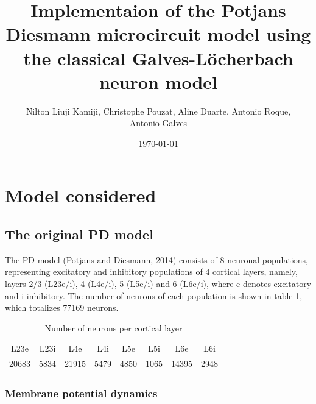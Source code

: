 \documentclass[11pt]{scrartcl}
\author{Nilton Liuji Kamiji, Christophe Pouzat, Aline Duarte, Antonio Roque, \\Antonio Galves}
\date{\today}
\title{Implementaion of the Potjans Diesmann microcircuit model using the classical Galves-L\"{o}cherbach neuron model}
\begin{document}
\maketitle
\tableofcontents
\pagebreak
\listoffigures
\pagebreak

\section{Model considered}
\label{sec:org8d5c27a}
\subsection{The original PD model}
\label{sec:orga57681e}
\label{org436adc3}

The PD model (Potjans and Diesmann, 2014) consists of 8 neuronal populations, representing excitatory and inhibitory populations of 4 cortical layers, namely, layers 2/3 (L23e/i), 4 (L4e/i), 5 (L5e/i) and 6 (L6e/i), where e denotes excitatory and i inhibitory. The number of neurons of each population is shown in table \ref{table:PD_num_neurons}, which totalizes 77169 neurons.
\begin{table}[htbp]
    \centering
    \caption{Number of neurons per cortical layer}
    \label{table:PD_num_neurons}
    \begin{tabular}{llllllll}
         \multicolumn{1}{c}{L23e} & \multicolumn{1}{c}{L23i} & \multicolumn{1}{c}{L4e} & \multicolumn{1}{c}{L4i} & \multicolumn{1}{c}{L5e} & \multicolumn{1}{c}{L5i} & \multicolumn{1}{c}{L6e} & \multicolumn{1}{c}{L6i} \\
         20683 & 5834 & 21915 & 5479 & 4850 & 1065 & 14395 & 2948 
    \end{tabular}
\end{table}

\subsubsection{Membrane potential dynamics}
\label{sec:org9141b64}
\label{org15d6235}
\end{document}
